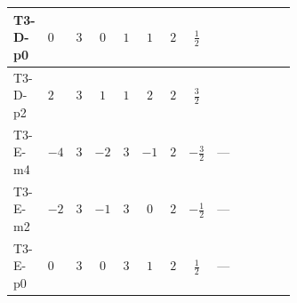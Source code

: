 \documentclass[8pt]{article}
\begin{document}
\begin{landscape}
\begin{longtable}{@{}llcccccc >{\raggedright\arraybackslash}p{0.21\linewidth} >{\raggedright\arraybackslash}p{0.21\linewidth} >{\raggedright\arraybackslash}p{0.21\linewidth}@{}}
\midrule
T3-D-p0 & $0$ & $3$ & $0$ & $1$ & $1$ & $2$ & $\frac{1}{2}$ & \scriptsize\adjustbox{max width=\linewidth}{$\begin{gathered} +2 {\lambda_{12}^{(1)}} {\lambda_{HS_2}^{(1)}}\end{gathered}$} & \scriptsize\adjustbox{max width=\linewidth}{$\begin{gathered} +6 {\lambda_1} {\lambda_{HS_1}^{(1)}}\end{gathered}$} & \scriptsize\adjustbox{max width=\linewidth}{$\begin{gathered} +4 {\lambda_{HS_1}^{(1)}}^2\end{gathered}$} \\
\midrule
T3-D-p2 & $2$ & $3$ & $1$ & $1$ & $2$ & $2$ & $\frac{3}{2}$ & \scriptsize\adjustbox{max width=\linewidth}{$\begin{gathered} +2 {\lambda_{12}^{(1)}} {\lambda_{HS_2}^{(1)}}\end{gathered}$} & \scriptsize\adjustbox{max width=\linewidth}{$\begin{gathered} +6 {\lambda_1} {\lambda_{HS_1}^{(1)}}\end{gathered}$} & \scriptsize\adjustbox{max width=\linewidth}{$\begin{gathered} +4 {\lambda_{HS_1}^{(1)}}^2\end{gathered}$} \\
\midrule
T3-E-m4 & $-4$ & $3$ & $-2$ & $3$ & $-1$ & $2$ & $-\frac{3}{2}$ & --- & \scriptsize\adjustbox{max width=\linewidth}{$\begin{gathered} +6 {\lambda_1} {\lambda_{HS_1}^{(1)}}\end{gathered}$} & \scriptsize\adjustbox{max width=\linewidth}{$\begin{gathered} +4 {\lambda_{HS_1}^{(1)}}^2\end{gathered}$} \\
\midrule
T3-E-m2 & $-2$ & $3$ & $-1$ & $3$ & $0$ & $2$ & $-\frac{1}{2}$ & --- & \scriptsize\adjustbox{max width=\linewidth}{$\begin{gathered} +6 {\lambda_1} {\lambda_{HS_1}^{(1)}}\end{gathered}$} & \scriptsize\adjustbox{max width=\linewidth}{$\begin{gathered} +4 {\lambda_{HS_1}^{(1)}}^2\end{gathered}$} \\
\midrule
T3-E-p0 & $0$ & $3$ & $0$ & $3$ & $1$ & $2$ & $\frac{1}{2}$ & --- & \scriptsize\adjustbox{max width=\linewidth}{$\begin{gathered} +6 {\lambda_1} {\lambda_{HS_1}^{(1)}}\end{gathered}$} & \scriptsize\adjustbox{max width=\linewidth}{$\begin{gathered} +4 {\lambda_{HS_1}^{(1)}}^2\end{gathered}$} \\

\end{longtable}
\end{landscape}
\end{document}
